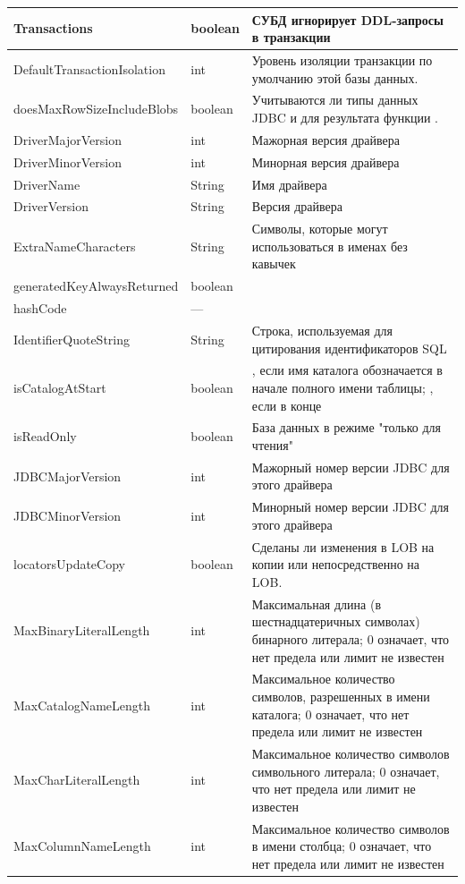 \begin{longtable}[c]{|>{\ttfamily}m{5.1cm}|>{\ttfamily\centering}m{1.3cm}|m{9.2cm}|}
	Transactions & boolean & СУБД игнорирует DDL-запросы в транзакции \\\hline 
	DefaultTransactionIsolation & int & Уровень изоляции транзакции по умолчанию этой базы данных.\\\hline 
	doesMaxRowSizeIncludeBlobs & boolean & Учитываются ли типы данных JDBC  \ttt{LONGVARCHAR} и \ttt{LONGVARBINARY} для результата функции \ttt{getMaxRowSize}.\\\hline 
	DriverMajorVersion & int & Мажорная версия драйвера \\\hline 
	DriverMinorVersion & int & Минорная версия драйвера \\\hline 
	DriverName & String & Имя драйвера \\\hline 
	DriverVersion & String & Версия драйвера\\\hline 
	ExtraNameCharacters & String & Символы, которые могут использоваться в именах без кавычек\\\hline 
	generatedKeyAlwaysReturned & boolean & \\\hline 
	hashCode & --- & \\\hline 
	IdentifierQuoteString & String & Строка, используемая для цитирования идентификаторов SQL\\\hline 
	isCatalogAtStart & boolean & \ttt{True}, если имя каталога обозначается в начале полного имени таблицы; \ttt{false}, если в конце\\\hline 
	isReadOnly & boolean & База данных в режиме "только для чтения"\\\hline 
	JDBCMajorVersion & int & Мажорный номер версии JDBC для этого драйвера\\\hline 
	JDBCMinorVersion & int & Минорный номер версии JDBC для этого драйвера\\\hline 
	locatorsUpdateCopy & boolean & Сделаны ли изменения в LOB на копии или непосредственно на LOB.\\\hline 
	MaxBinaryLiteralLength & int &  Максимальная длина (в шестнадцатеричных символах) бинарного литерала; 0 означает, что нет предела или лимит не известен\\\hline 
	MaxCatalogNameLength & int & Максимальное количество символов, разрешенных в имени каталога; 0 означает, что нет предела или лимит не известен\\\hline 
	MaxCharLiteralLength & int & Максимальное количество символов символьного литерала; 0 означает, что нет предела или лимит не известен\\\hline 
	MaxColumnNameLength & int & Максимальное количество символов в имени столбца; 0 означает, что нет предела или лимит не известен \\\hline 

\end{longtable}
